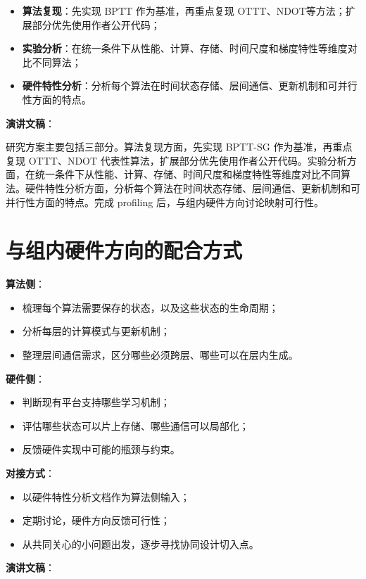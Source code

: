 \documentclass[journal,12pt,onecolumn]{IEEEtran}
\begin{document}
\begin{itemize}
    \item \textbf{算法复现}：先实现 BPTT 作为基准，再重点复现 OTTT、NDOT等方法；扩展部分优先使用作者公开代码；
    \item \textbf{实验分析}：在统一条件下从性能、计算、存储、时间尺度和梯度特性等维度对比不同算法；
    \item \textbf{硬件特性分析}：分析每个算法在时间状态存储、层间通信、更新机制和可并行性方面的特点。
\end{itemize}

\textbf{演讲文稿}：

研究方案主要包括三部分。算法复现方面，先实现 BPTT-SG 作为基准，再重点复现 OTTT、NDOT 代表性算法，扩展部分优先使用作者公开代码。实验分析方面，在统一条件下从性能、计算、存储、时间尺度和梯度特性等维度对比不同算法。硬件特性分析方面，分析每个算法在时间状态存储、层间通信、更新机制和可并行性方面的特点。完成 profiling 后，与组内硬件方向讨论映射可行性。

\section{与组内硬件方向的配合方式}

\textbf{算法侧}：
\begin{itemize}
    \item 梳理每个算法需要保存的状态，以及这些状态的生命周期；
    \item 分析每层的计算模式与更新机制；
    \item 整理层间通信需求，区分哪些必须跨层、哪些可以在层内生成。
\end{itemize}

\textbf{硬件侧}：
\begin{itemize}
    \item 判断现有平台支持哪些学习机制；
    \item 评估哪些状态可以片上存储、哪些通信可以局部化；
    \item 反馈硬件实现中可能的瓶颈与约束。
\end{itemize}

\textbf{对接方式}：
\begin{itemize}
    \item 以硬件特性分析文档作为算法侧输入；
    \item 定期讨论，硬件方向反馈可行性；
    \item 从共同关心的小问题出发，逐步寻找协同设计切入点。
\end{itemize}

\textbf{演讲文稿}：
\end{document}
